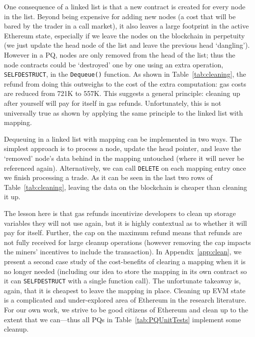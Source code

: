 One consequence of a linked list is that a new contract is created for every node in the list. Beyond being expensive for adding new nodes (a cost that will be bared by the trader in a call market), it also leaves a large footprint in the active Ethereum state, especially if we leave the nodes on the blockchain in perpetuity (\ie we just update the head node of the list and leave the previous head `dangling'). However in a PQ, nodes are only removed from the head of the list; thus the node contracts could be `destroyed' one by one using an extra operation, \texttt{SELFDESTRUCT}, in the \texttt{Dequeue()} function. As shown in Table~\ref{tab:cleaning}, the refund from doing this outweighs to the cost of the extra computation: gas costs are reduced from 721K to 557K.  This suggests a general principle: cleaning up after yourself will pay for itself in gas refunds. Unfortunately, this is not universally true as shown by applying the same principle to the linked list with mapping.

Dequeuing in a linked list with mapping can be implemented in two ways. The simplest approach is to process a node, update the head pointer, and leave the `removed' node's data behind in the mapping untouched (where it will never be referenced again). Alternatively, we can call \texttt{DELETE} on each mapping entry once we finish processing a trade. As it can be seen in the last two rows of Table~\ref{tab:cleaning}, leaving the data on the blockchain is cheaper than cleaning it up.

The lesson here is that gas refunds incentivize developers to clean up storage variables they will not use again, but it is highly contextual as to whether it will pay for itself. Further, the cap on the maximum refund means that refunds are not fully received for large cleanup operations (however removing the cap impacts the miners' incentives to include the transaction).  In Appendix~\ref{app:clean}, we present a second case study of the cost-benefits of clearing a mapping when it is no longer needed (including our idea to store the mapping in its own contract so it can \texttt{SELFDESTRUCT} with a single function call). The unfortunate takeaway is, again, that it is cheapest to leave the mapping in place. Cleaning up EVM state is a complicated and under-explored area of Ethereum in the research literature. For our own work, we strive to be good citizens of Ethereum and clean up to the extent that we can---thus all PQs in Table~\ref{tab:PQUnitTests} implement some cleanup.



